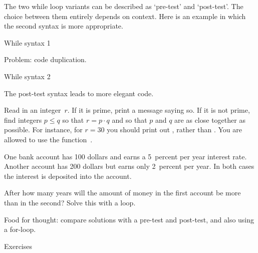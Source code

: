 The two while loop variants can be described as `pre-test' and
`post-test'. The choice between them entirely depends on context. Here
is an example in which the second syntax is more appropriate.

\begin{block}{While syntax 1}
  \label{sl:while2}

  Problem: code duplication.
\end{block}

\begin{block}{While syntax 2}
  \label{sl:while3}

  The post-test syntax leads to more elegant code.
\end{block}

\begin{exercise}
  \label{ex:squaregrid}
  Read in an integer~$r$. If it is prime, print a message saying so.
  If it is not prime, find integers $p\leq q$ so that $r=p\cdot q$ and so
  that $p$ and $q$ are as close together as possible.
  For instance, for $r=30$ you should print out , rather than
  . You are allowed to use the function~.
\end{exercise}

\begin{exercise}
  \label{ex:interest}
  One bank account has 100 dollars and earns a 5~percent per year interest
  rate. Another account has 200 dollars but earns only 2~percent per
  year. In both cases the interest is deposited into the account.
  
  After how many years will the amount of money in the first account
  be more than in the second? Solve this with a  loop.

  Food for thought: compare solutions with a pre-test and post-test,
  and also using a for-loop.
\end{exercise}

 {Exercises}

